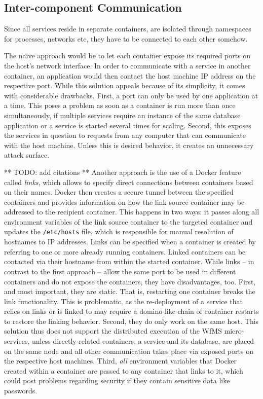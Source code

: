 \subsection{Inter-component Communication} %
\label{sub:inter_component_communication}

  Since all services reside in separate containers, \ie are isolated through namespaces for processes, networks etc, they have to be connected to each other somehow.

  The naïve approach would be to let each container expose its required ports on the host's network interface. In order to communicate with a service in another container, an application would then contact the host machine \ac{IP} address on the respective port. While this solution appeals because of its simplicity, it comes with considerable drawbacks.
  First, a port can only be used by one application at a time. This poses a problem as soon as a container is run more than once simultaneously, \eg if multiple services require an instance of the same database application or a service is started several times for scaling.
  Second, this exposes the services in question to requests from any computer that can communicate with the host machine. Unless this is desired behavior, it creates an unnecessary attack surface.

  ** TODO: add citations **
  Another approach is the use of a Docker feature called \emph{links}, which allows to specify direct connections between containers based on their names.
  Docker then creates a secure tunnel between the specified containers and provides information on how the link source container may be addressed to the recipient container. This happens in two ways: it passes along all environment variables of the link source container to the targeted container and updates the \texttt{/etc/hosts} file, which is responsible for manual resolution of hostnames to \ac{IP} addresses.
  Links can be specified when a container is created by referring to one or more already running containers.
  Linked containers can be contacted via their hostname from within the started container.
  While links -- in contrast to the first approach -- allow the same port to be used in different containers and do not expose the containers, they have disadvantages, too.
  First, and most important, they are static. That is, restarting one container breaks the link functionality. This is problematic, as the re-deployment of a service that relies on links or is linked to may require a domino-like chain of container restarts to restore the linking behavior.
  Second, they do only work on the same host. This solution thus does not support the distributed execution of the \ac{WfMS} micro-services, unless directly related containers, \eg a service and its database, are placed on the same node and all other communication takes place via exposed ports on the respective host machines.
  Third, \emph{all} environment variables that Docker created within a container are passed to any container that links to it, which could post problems regarding security if they contain sensitive data like passwords.

